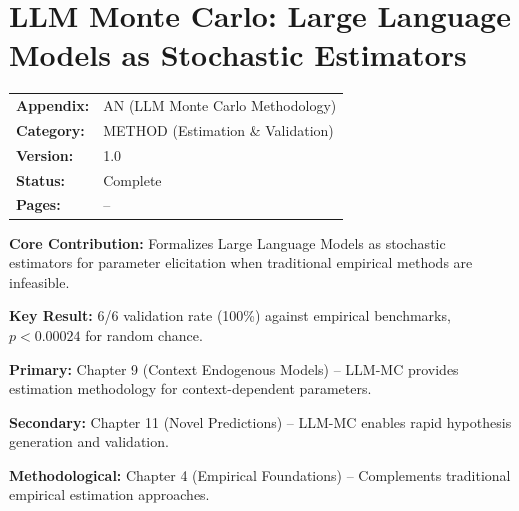
\section{LLM Monte Carlo: Large Language Models as Stochastic Estimators}
\label{app:llm-monte-carlo}


\begin{tcolorbox}[colback=blue!5!white, colframe=blue!75!black,
    title=\textbf{Appendix AN: METHOD-LLMMC}]

\begin{tabular}{@{}ll@{}}
\textbf{Appendix:} & AN (LLM Monte Carlo Methodology) \\
\textbf{Category:} & METHOD (Estimation \& Validation) \\
\textbf{Version:} & 1.0 \\
\textbf{Status:} & Complete \\
\textbf{Pages:} & \pageref{app:llm-monte-carlo}--\pageref{sec:AN-footer} \\
\end{tabular}

\tcblower

\textbf{Core Contribution:} Formalizes Large Language Models as stochastic estimators
for parameter elicitation when traditional empirical methods are infeasible.

\textbf{Key Result:} 6/6 validation rate (100\%) against empirical benchmarks,
$p < 0.00024$ for random chance.

\end{tcolorbox}


\begin{tcolorbox}[colback=gray!10!white, colframe=gray!75!black,
    title=\textbf{Chapter Linkage}]

\textbf{Primary:} Chapter 9 (Context Endogenous Models) -- LLM-MC provides
estimation methodology for context-dependent parameters.

\textbf{Secondary:} Chapter 11 (Novel Predictions) -- LLM-MC enables rapid
hypothesis generation and validation.

\textbf{Methodological:} Chapter 4 (Empirical Foundations) -- Complements
traditional empirical estimation approaches.

\end{tcolorbox}

